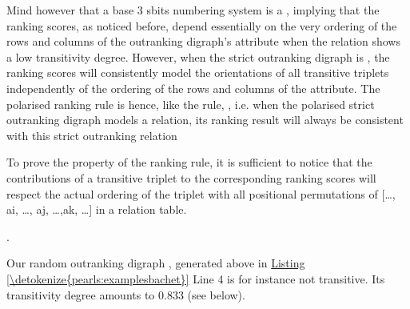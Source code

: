 \documentclass[a4paper,12pt,english]{sphinxhowto}
\begin{document}
\sphinxAtStartPar
Mind however that a base 3 sbits numbering system is a , implying that the  ranking scores, as noticed before, depend essentially on the very ordering of the rows and columns of the outranking digraph’s  attribute when the relation shows a low transitivity degree. However, when the strict outranking digraph is , the  ranking scores will consistently model the orientations of all transitive triplets independently of the ordering of the rows and columns of the  attribute. The polarised  ranking rule is hence, like the  rule, , i.e. when the polarised strict outranking digraph models a  relation, its  ranking result will always be consistent with this strict outranking relation %
\begin{footnote}[23]\sphinxAtStartFootnote
To prove the  property of the  ranking rule, it is sufficient to notice that the contributions of a transitive triplet  to the corresponding  ranking scores will respect the actual ordering of the triplet with all positional permutations of {[}…, ai, …, aj, …,ak, …{]} in a relation table.
%
\end{footnote}.

\sphinxAtStartPar
Our random outranking digraph , generated above in \hyperref[\detokenize{pearls:examplesbachet}]{Listing \ref{\detokenize{pearls:examplesbachet}}} Line 4 is for instance not transitive. Its transitivity degree amounts to 0.833 (see below).
\end{document}

